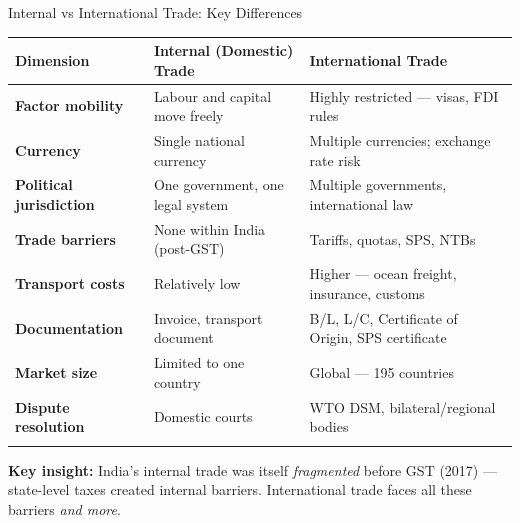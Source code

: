 \documentclass[
  ignorenonframetext,
  aspectratio=169,
]{beamer}
\makeatletter
\let\quarto@originallabel\label
\DeclareRobustCommand*{\label}[1]{\quarto@originallabel{#1}}
\makeatother
\begin{document}
\begin{frame}{Internal vs International Trade: Key Differences}
\label{internal-vs-international-trade-key-differences}
\begin{longtable}[]{@{}
  >{\raggedright\arraybackslash}p{}
  >{\raggedright\arraybackslash}p{}
  >{\raggedright\arraybackslash}p{}@{}}
\toprule\noalign{}
\begin{minipage}[b]{\linewidth}\raggedright
Dimension
\end{minipage} & \begin{minipage}[b]{\linewidth}\raggedright
Internal (Domestic) Trade
\end{minipage} & \begin{minipage}[b]{\linewidth}\raggedright
International Trade
\end{minipage} \\
\midrule\noalign{}
\endhead
\textbf{Factor mobility} & Labour and capital move freely & Highly
restricted --- visas, FDI rules \\
\textbf{Currency} & Single national currency & Multiple currencies;
exchange rate risk \\
\textbf{Political jurisdiction} & One government, one legal system &
Multiple governments, international law \\
\textbf{Trade barriers} & None within India (post-GST) & Tariffs,
quotas, SPS, NTBs \\
\textbf{Transport costs} & Relatively low & Higher --- ocean freight,
insurance, customs \\
\textbf{Documentation} & Invoice, transport document & B/L, L/C,
Certificate of Origin, SPS certificate \\
\textbf{Market size} & Limited to one country & Global --- 195
countries \\
\textbf{Dispute resolution} & Domestic courts & WTO DSM,
bilateral/regional bodies \\
\bottomrule\noalign{}
\end{longtable}

\textbf{Key insight:} India's internal trade was itself
\emph{fragmented} before GST (2017) --- state-level taxes created
internal barriers. International trade faces all these barriers
\emph{and more}.
\end{frame}
\end{document}
